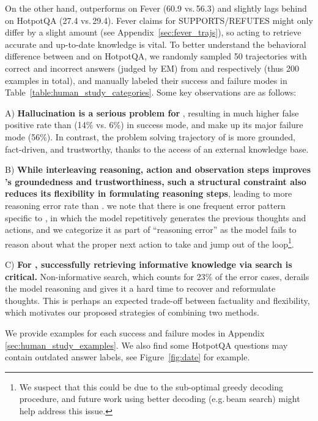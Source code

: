 On the other hand, \model{} outperforms \reason{} on Fever (60.9 vs.\,56.3) and slightly lags behind \reason{} on HotpotQA (27.4 vs.\,29.4). 
Fever claims for SUPPORTS/REFUTES might only differ by a slight amount (see Appendix~\ref{sec:fever_trajs}), so acting to retrieve accurate and up-to-date knowledge is vital. 
To better understand the behavioral difference between \model{} and \reason{} on HotpotQA, we randomly sampled 50 trajectories with correct and incorrect answers (judged by EM) from \model{} and \reason{} respectively (thus 200 examples in total), and manually labeled their success and failure modes in Table~\ref{table:human_study_categories}. 
Some key observations are as follows:

\quad A) \textbf{Hallucination is a serious problem for \reason}, resulting in much higher false positive rate than \model{} (14\% vs. 6\%) in success mode, and make up its major failure mode (56\%).
In contrast, the problem solving trajectory of \model is more grounded, fact-driven, and trustworthy, thanks to the access of an external knowledge base.

\quad B) \textbf{While interleaving reasoning, action and observation steps improves \model's groundedness and trustworthiness, such a structural constraint also reduces its flexibility in formulating reasoning steps}, leading to more reasoning error rate than \reason. 
we note that there is one frequent error pattern specific to \model, in which the model repetitively generates the previous thoughts and actions, and we categorize it as part of ``reasoning error'' as the model fails to reason about what the proper next action to take and jump out of the loop\footnote{We suspect that this could be due to the sub-optimal greedy decoding procedure, and future work using better decoding (e.g.\,beam search) might help address this issue.}. 

\quad C) \textbf{For \model, successfully retrieving informative knowledge via search is critical.} Non-informative search, which counts for 23\% of the error cases, derails the model reasoning and gives it a hard time to recover and reformulate thoughts. This is perhaps an expected trade-off between factuality and flexibility, which motivates our proposed strategies of combining two methods.


We provide examples for each success and failure modes in Appendix \ref{sec:human_study_examples}. We also find some HotpotQA questions may contain outdated answer labels, see Figure~\ref{fig:date} for example.


